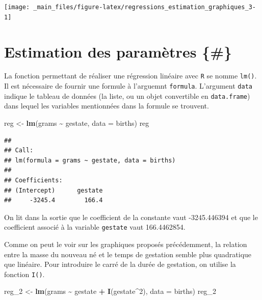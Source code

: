 \documentclass[
  11pt,
]{book}
\newenvironment{Shaded}{\begin{snugshade}}{\end{snugshade}}
\newcommand{\DataTypeTok}[1]{\textcolor[rgb]{0.13,0.29,0.53}{#1}}
\newcommand{\DecValTok}[1]{\textcolor[rgb]{0.00,0.00,0.81}{#1}}
\newcommand{\KeywordTok}[1]{\textcolor[rgb]{0.13,0.29,0.53}{\textbf{#1}}}
\newcommand{\NormalTok}[1]{#1}
\newcommand{\OperatorTok}[1]{\textcolor[rgb]{0.81,0.36,0.00}{\textbf{#1}}}
\newcommand{\StringTok}[1]{\textcolor[rgb]{0.31,0.60,0.02}{#1}}
\numberwithin{equation}{section}
\numberwithin{countremarque}{section}
\begin{document}
\begin{center}\texttt{[image: \_main\_files/figure-latex/regressions\_estimation\_graphiques\_3-1]} \end{center}

\hypertarget{estimation-des-paramuxe8tres}{%
\section{Estimation des paramètres \{\#\}}\label{estimation-des-paramuxe8tres}}

La fonction permettant de réaliser une régression linéaire avec \texttt{R} se nomme \texttt{lm()}. Il est nécessaire de fournir une formule à l'arguemnt \texttt{formula}. L'argument \texttt{data} indique le tableau de données (la liste, ou un objet convertible en \texttt{data.frame}) dans lequel les variables mentionnées dans la formule se trouvent.

\begin{Shaded}
\begin{Highlighting}[]
\NormalTok{reg \textless{}{-}}\StringTok{ }\KeywordTok{lm}\NormalTok{(grams }\OperatorTok{\textasciitilde{}}\StringTok{ }\NormalTok{gestate, }\DataTypeTok{data =}\NormalTok{ births)}
\NormalTok{reg}
\end{Highlighting}
\end{Shaded}

\begin{lstlisting}
## 
## Call:
## lm(formula = grams ~ gestate, data = births)
## 
## Coefficients:
## (Intercept)      gestate  
##     -3245.4        166.4
\end{lstlisting}

On lit dans la sortie que le coefficient de la constante vaut -3245.446394 et que le coefficient associé à la variable \texttt{gestate} vaut 166.4462854.

Comme on peut le voir sur les graphiques proposés précédemment, la relation entre la masse du nouveau né et le temps de gestation semble plus quadratique que linéaire. Pour introduire le carré de la durée de gestation, on utilise la fonction \texttt{I()}.

\begin{Shaded}
\begin{Highlighting}[]
\NormalTok{reg\_}\DecValTok{2}\NormalTok{ \textless{}{-}}\StringTok{ }\KeywordTok{lm}\NormalTok{(grams }\OperatorTok{\textasciitilde{}}\StringTok{ }\NormalTok{gestate }\OperatorTok{+}\StringTok{ }\KeywordTok{I}\NormalTok{(gestate}\OperatorTok{\^{}}\DecValTok{2}\NormalTok{), }\DataTypeTok{data =}\NormalTok{ births)}
\NormalTok{reg\_}\DecValTok{2}
\end{Highlighting}
\end{Shaded}
\end{document}

